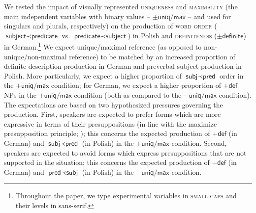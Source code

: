 \documentclass[output=paper]{langscibook}
\begin{document}
We tested the impact of visually represented \textsc{uniqueness} and \textsc{maximality} (the main independent variables with binary values -- $\pm\textsf{uniq/max}$ -- and used for singulars and plurals, respectively) on the production of \textsc{word order} ($\textsf{subject}\prec\textsf{predicate}$ vs. $\textsf{predicate}\prec\textsf{subject}$) in Polish and \textsc{definiteness} ($\pm\textsf{definite}$) in German.\footnote{Throughout the paper, we type experimental variables in \textsc{small caps} and their levels in \textsf{sans-serif}.} We expect unique/maximal reference (as opposed to non-unique/non-max\-i\-mal reference) to be matched by an increased proportion of definite description production in German and preverbal subject production in Polish. More particularly, we expect a higher proportion of $\textsf{subj}\prec\textsf{pred}$ order in the $+\textsf{uniq/max}$ condition; for German, we expect a higher proportion of $+\textsf{def}$ NPs in the $+\textsf{uniq/max}$ condition (both as compared to the $-\textsf{uniq/max}$ condition). The expectations are based on two hypothesized pressures governing the production. First, speakers are expected to prefer forms which are more expressive in terms of their presuppositions (in line with the maximize presupposition principle; \citealt{Heim1991}); this concerns the expected production of $+\textsf{def}$ (in German) and $\textsf{subj}\prec\textsf{pred}$ (in Polish) in the $+\textsf{uniq/max}$ condition. Second, speakers are expected to avoid forms which express presuppositions that are not supported in the situation; this concerns the expected production of $-\textsf{def}$ (in German) and $\textsf{pred}\prec\textsf{subj}$ (in Polish) in the $-\textsf{uniq/max}$ condition.
\end{document}
